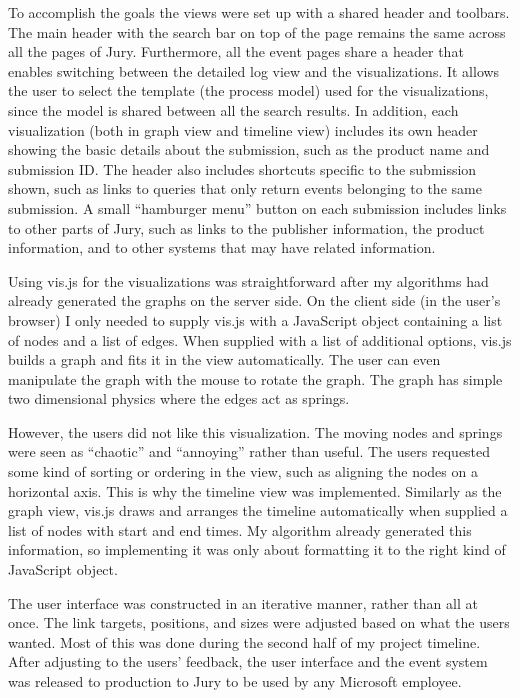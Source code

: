 To accomplish the goals the views were set up with a shared header and toolbars.
The main header with the search bar on top of the page remains the same across all the pages of Jury.
Furthermore, all the event pages share a header that enables switching between the detailed log view and the visualizations. 
It allows the user to select the template (the process model) used for the visualizations, since the model is shared between all the search results.
In addition, each visualization (both in graph view and timeline view) includes its own header showing the basic details about the submission, such as the product name and submission ID. The header also includes shortcuts specific to the submission shown, such as links to queries that only return events belonging to the same submission.
A small ``hamburger menu'' button on each submission includes links to other parts of Jury, such as links to the publisher information, the product information, and to other systems that may have related information.

Using vis.js for the visualizations was straightforward after my algorithms had already generated the graphs on the server side. 
On the client side (in the user's browser) I only needed to supply vis.js with a JavaScript object containing a list of nodes and a list of edges. When supplied with a list of additional options, vis.js builds a graph and fits it in the view automatically. The user can even manipulate the graph with the mouse to rotate the graph. The graph has simple two dimensional physics where the edges act as springs.

However, the users did not like this visualization. The moving nodes and springs were seen as ``chaotic'' and ``annoying'' rather than useful. 
The users requested some kind of sorting or ordering in the view, such as aligning the nodes on a horizontal axis. 
This is why the timeline view was implemented. 
Similarly as the graph view, vis.js draws and arranges the timeline automatically when supplied a list of nodes with start and end times.
My algorithm already generated this information, so implementing it was only about formatting it to the right kind of JavaScript object.

The user interface was constructed in an iterative manner, rather than all at once. The link targets, positions, and sizes were adjusted based on what the users wanted. Most of this was done during the second half of my project timeline.
After adjusting to the users' feedback, the user interface and the event system was released to production to Jury to be used by any Microsoft employee.

